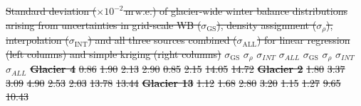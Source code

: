 \documentclass[review,oneside, letterpaper]{igs} %
\providecommand{\DIFdel}[1]{{\protect\color{red}\sout{#1}}}                      %
\providecommand{\DIFdelFL}[1]{\DIFdel{#1}} %
\begin{document}
{%
\DIFdelFL{Standard deviation ($\times10^{-2}$\,m\,w.e.) of glacier-wide winter balance distributions arising from uncertainties in grid-scale WB ($\sigma_{\mathrm{GS}}$), density assignment ($\sigma_{\rho}$), interpolation ($\sigma_{\mathrm{INT}}$) and all three sources combined ($\sigma_{\mathrm{ALL}}$) for linear regression (left columns) and simple kriging (right columns)}}
\textbf{} %
\DIFdelFL{$\sigma_{\mathrm{GS}}$ }%
\DIFdelFL{$\sigma_{\rho}$ }%
\DIFdelFL{$\sigma_{INT}$ }%
\DIFdelFL{$\sigma_{ALL}$ }%
\DIFdelFL{$\sigma_{\mathrm{GS}}$ }%
\DIFdelFL{$\sigma_{\rho}$ }%
\DIFdelFL{$\sigma_{INT}$ }%
\DIFdelFL{$\sigma_{ALL}$ }%
\textbf{\DIFdelFL{Glacier 4}} %
\DIFdelFL{0.86 }%
\DIFdelFL{1.90 }%
\DIFdelFL{2.13 }%
\DIFdelFL{2.90 }%
\DIFdelFL{0.85 }%
\DIFdelFL{2.15 }%
\DIFdelFL{14.05 }%
\DIFdelFL{14.72 }%
\textbf{\DIFdelFL{Glacier 2}} %
\DIFdelFL{1.80 }%
\DIFdelFL{3.37 }%
\DIFdelFL{3.09 }%
\DIFdelFL{4.90 }%
\DIFdelFL{2.53 }%
\DIFdelFL{2.03 }%
\DIFdelFL{13.78 }%
\DIFdelFL{13.44 }%
\textbf{\DIFdelFL{Glacier 13}} %
\DIFdelFL{1.12 }%
\DIFdelFL{1.68 }%
\DIFdelFL{2.80 }%
\DIFdelFL{3.20 }%
\DIFdelFL{1.15 }%
\DIFdelFL{1.27 }%
\DIFdelFL{9.65 }%
\DIFdelFL{10.43
}%
\end{document}
